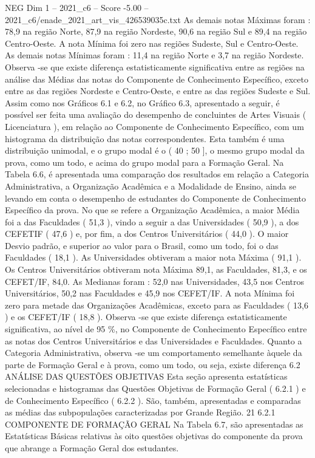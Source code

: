 \begin{textsample}{NEG Dim 1 – 2021\_c6 – Score -5.00 – 2021\_c6/enade\_2021\_art\_vis\_426539035c.txt}
As demais notas Máximas foram : 78,9 na região Norte, 87,9 na região Nordeste, 90,6 na região Sul e 89,4 na região Centro-Oeste.
A nota Mínima foi zero nas regiões Sudeste, Sul e Centro-Oeste.
As demais notas Mínimas foram : 11,4 na região Norte e 3,7 na região Nordeste.
Observa -se que existe diferença estatisticamente significativa entre as regiões na análise das Médias das notas do Componente de Conhecimento Específico, exceto entre as das regiões Nordeste e Centro-Oeste, e entre as das regiões Sudeste e Sul.
Assim como nos Gráficos 6.1 e 6.2, no Gráfico 6.3, apresentado a seguir, é possível ser feita uma avaliação do desempenho de concluintes de Artes Visuais ( Licenciatura ), em relação ao Componente de Conhecimento Específico, com um histograma da distribuição das notas correspondentes.
Esta também é uma distribuição unimodal, e o grupo modal é o ( 40 ; 50 ], o mesmo grupo modal da prova, como um todo, e acima do grupo modal para a Formação Geral.
Na Tabela 6.6, é apresentada uma comparação dos resultados em relação a Categoria Administrativa, a Organização Acadêmica e a Modalidade de Ensino, ainda se levando em conta o desempenho de estudantes do Componente de Conhecimento Específico da prova.
No que se refere a Organização Acadêmica, a maior Média foi a das Faculdades ( 51,3 ), vindo a seguir a das Universidades ( 50,9 ), a dos CEFETIF ( 47,6 ) e, por fim, a dos Centros Universitários ( 44,0 ).
O maior Desvio padrão, e superior ao valor para o Brasil, como um todo, foi o das Faculdades ( 18,1 ).
As Universidades obtiveram a maior nota Máxima ( 91,1 ).
Os Centros Universitários obtiveram nota Máxima 89,1, as Faculdades, 81,3, e os CEFET/IF, 84,0.
As Medianas foram : 52,0 nas Universidades, 43,5 nos Centros Universitários, 50,2 nas Faculdades e 45,9 nos CEFET/IF.
A nota Mínima foi zero para metade das Organizações Acadêmicas, exceto para as Faculdades ( 13,6 ) e os CEFET/IF ( 18,8 ).
Observa -se que existe diferença estatisticamente significativa, ao nível de 95 \%, no Componente de Conhecimento Específico entre as notas dos Centros Universitários e das Universidades e Faculdades.
Quanto a Categoria Administrativa, observa -se um comportamento semelhante àquele da parte de Formação Geral e à prova, como um todo, ou seja, existe diferença 6.2 ANÁLISE DAS QUESTÕES OBJETIVAS Esta seção apresenta estatísticas selecionadas e histogramas das Questões Objetivas de Formação Geral ( 6.2.1 ) e de Conhecimento Específico ( 6.2.2 ).
São, também, apresentadas e comparadas as médias das subpopulações caracterizadas por Grande Região. 21 6.2.1 COMPONENTE DE FORMAÇÃO GERAL Na Tabela 6.7, são apresentadas as Estatísticas Básicas relativas às oito questões objetivas do componente da prova que abrange a Formação Geral dos estudantes.

\end{textsample}

